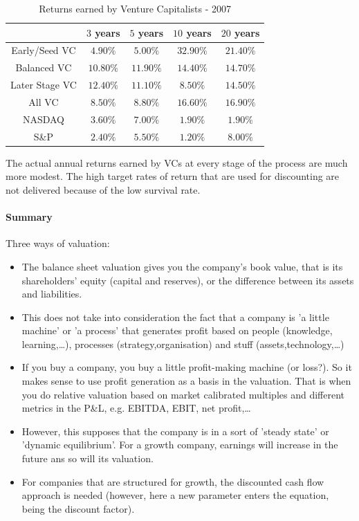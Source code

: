 \begin{table}[H]
    \centering
    \begin{tabular}{|c|c|c|c|c|}
        \hline
        & $3$ years & $5$ years & $10$ years & $20$ years \\ \hline
        Early/Seed VC & $4.90 \%$ & $5.00\%$ & $32.90\%$ & $21.40\%$ \\ \hline
        Balanced VC & $10.80\%$ & $11.90\%$ & $14.40\%$ & $14.70\%$ \\ \hline
        Later Stage VC & $12.40\%$ & $11.10\%$ & $8.50\%$ & $14.50\%$ \\ \hline
        All VC & $8.50\%$ & $8.80\%$ & $16.60\%$ & $16.90\%$ \\ \hline
        NASDAQ & $3.60\%$ & $7.00\%$ & $1.90\%$ & $1.90\%$ \\ \hline
        S\&P & $2.40\%$ & $5.50\%$ & $1.20\%$ & $8.00\%$ \\ \hline
    \end{tabular}
    \caption{Returns earned by Venture Capitalists - 2007}
\end{table}

The actual annual returns earned by VCs at every stage of the process are much
more modest. The high target rates of return that are used for discounting are
not delivered because of the low survival rate.

\paragraph{Summary}
Three ways of valuation:
\begin{itemize}
    \item The balance sheet valuation gives you the company's book value,
        that is its shareholders' equity (capital and reserves), or the
        difference between its assets and liabilities.
    \item This does not take into consideration the fact that a company is
        'a little machine' or 'a process' that generates profit based on people
        (knowledge, learning,\dots), processes (strategy,organisation) and
        stuff (assets,technology,\dots)
    \item If you buy a company, you buy a little profit-making machine (or loss?).
        So it makes sense to use profit generation as a basis in the valuation.
        That is when you do relative valuation based on market calibrated
        multiples and different metrics in the P\&L, e.g. EBITDA, EBIT, net profit,\dots
    \item However, this supposes that the company is in a sort of 'steady state'
        or 'dynamic equilibrium'. For a growth company, earnings will
        increase in the future ans so will its valuation.
    \item For companies that are structured for growth, the discounted cash flow
        approach is needed (however, here a new parameter enters the equation,
        being the discount factor).
\end{itemize}

